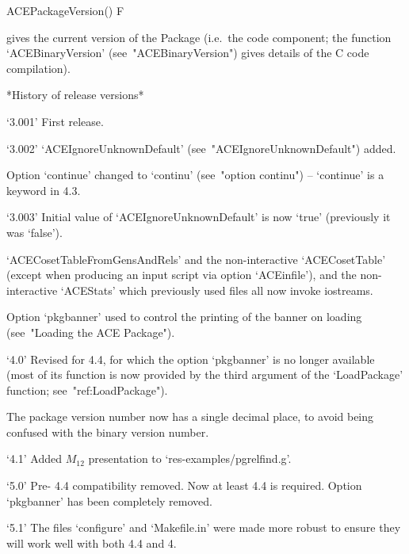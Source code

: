 \>ACEPackageVersion() F

gives the current version of the {\ACE} Package (i.e.~the {\GAP}  code
component; the  function  `ACEBinaryVersion'  (see~"ACEBinaryVersion")
gives details of the C code compilation).

*History of release versions*

\beginlist

\item{`3.001'}
First release.

\item{`3.002'}
`ACEIgnoreUnknownDefault' (see~"ACEIgnoreUnknownDefault")  added.

\item{}
Option `continue'  changed  to  `continu'  (see~"option  continu")  --
`continue' is a keyword in {\GAP} 4.3.

\item{`3.003'}
Initial value of `ACEIgnoreUnknownDefault' is now  `true'  (previously
it was `false').

\item{}
`ACECosetTableFromGensAndRels' and the non-interactive `ACECosetTable'
(except when producing an input script via  option  `ACEinfile'),  and
the non-interactive `ACEStats' which previously  used  files  all  now
invoke iostreams.

\item{}
Option `pkgbanner' used to control  the  printing  of  the  banner  on
loading (see~"Loading the ACE Package").

\item{`4.0'}
Revised for {\GAP} 4.4, for which the option `pkgbanner' is no  longer
available (most of its function is now provided by the third  argument
of the `LoadPackage' function; see~"ref:LoadPackage").

\item{}
The package version number now has a single decimal  place,  to  avoid
being confused with the binary version number.

\item{`4.1'}
Added $M_{12}$ presentation to `res-examples/pgrelfind.g'.

\item{`5.0'}
Pre-{\GAP} 4.4 compatibility removed.  Now  at  least  {\GAP}  4.4  is
required. Option `pkgbanner' has been completely removed.

\item{`5.1'}
The files `configure' and `Makefile.in' were made more robust to ensure
they will work well with both {\GAP} 4.4 and {\GAP} 4.

\endlist

